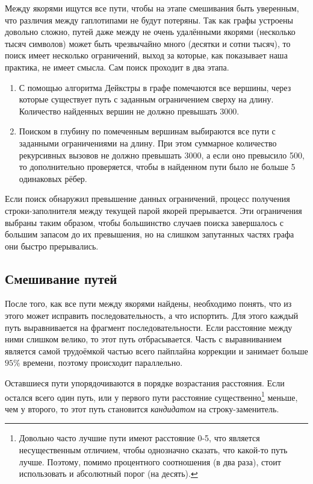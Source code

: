 \documentclass[14pt]{matmex-diploma-custom}
\begin{document}
Между якорями ищутся все пути, чтобы на этапе смешивания быть уверенным, что различия между гаплотипами не будут потеряны. Так как графы устроены довольно сложно, путей даже между не очень удалёнными якорями (несколько тысяч символов) может быть чрезвычайно много (десятки и сотни тысяч), то поиск имеет несколько ограничений, выход за которые, как показывает наша практика, не имеет смысла. Сам поиск проходит в два этапа.
\begin{enumerate}
    \item С помощью алгоритма Дейкстры в графе помечаются все вершины, через которые существует путь с заданным ограничением сверху на длину. Количество найденных вершин не должно превышать 3000.
    \item Поиском в глубину по помеченным вершинам выбираются все пути с заданными ограничениями на длину. При этом суммарное количество рекурсивных вызовов не должно превышать 3000, а если оно превысило 500, то дополнительно проверяется, чтобы в найденном пути было не больше 5 одинаковых рёбер.
\end{enumerate}
Если поиск обнаружил превышение данных ограничений, процесс получения строки-заполнителя между текущей парой якорей прерывается. Эти ограничения выбраны таким образом, чтобы большинство случаев поиска завершалось с большим запасом до их превышения, но на слишком запутанных частях графа они быстро прерывались.

\subsection{Смешивание путей}
После того, как все пути между якорями найдены, необходимо понять, что из этого может исправить последовательность, а что испортить. 
Для этого каждый путь выравнивается на фрагмент последовательности. Если расстояние между ними слишком велико, то этот путь отбрасывается. Часть с выравниванием является самой трудоёмкой частью всего пайплайна коррекции и занимает больше $95\%$ времени, поэтому происходит параллельно.

Оставшиеся пути упорядочиваются в порядке возрастания расстояния. Если остался всего один путь, или у первого пути расстояние существенно\footnote{Довольно часто лучшие пути имеют расстояние 0-5, что является несущественным отличием, чтобы однозначно сказать, что какой-то путь лучше. Поэтому, помимо процентного соотношения (в два раза), стоит использовать и абсолютный порог (на десять).} меньше, чем у второго, то этот путь становится \textit{кандидатом} на строку-заменитель.
\end{document}
